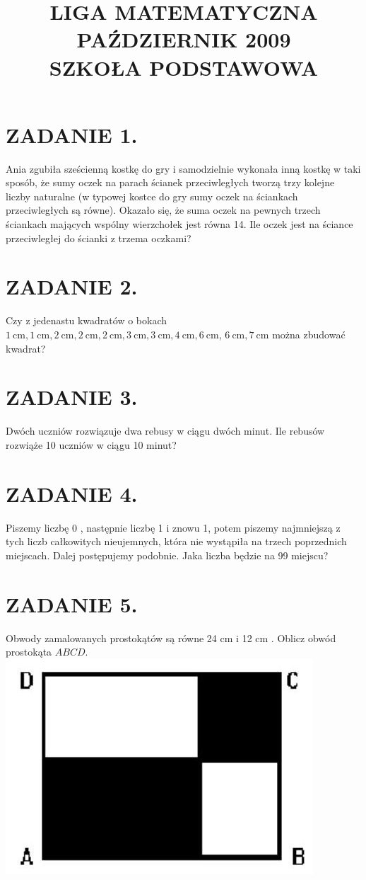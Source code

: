 \documentclass[10pt]{article}
\title{LIGA MATEMATYCZNA \\
 PAŹDZIERNIK 2009 \\
 SZKOŁA PODSTAWOWA }
\author{}
\date{}
\begin{document}
\maketitle
\section*{ZADANIE 1.}
Ania zgubiła sześcienną kostkę do gry i samodzielnie wykonała inną kostkę w taki sposób, że sumy oczek na parach ścianek przeciwległych tworzą trzy kolejne liczby naturalne (w typowej kostce do gry sumy oczek na ściankach przeciwległych są równe). Okazało się, że suma oczek na pewnych trzech ściankach mających wspólny wierzchołek jest równa 14. Ile oczek jest na ściance przeciwległej do ścianki z trzema oczkami?

\section*{ZADANIE 2.}
Czy z jedenastu kwadratów o bokach \(1 \mathrm{~cm}, 1 \mathrm{~cm}, 2 \mathrm{~cm}, 2 \mathrm{~cm}, 2 \mathrm{~cm}, 3 \mathrm{~cm}, 3 \mathrm{~cm}, 4 \mathrm{~cm}, 6 \mathrm{~cm}\), \(6 \mathrm{~cm}, 7 \mathrm{~cm}\) można zbudować kwadrat?

\section*{ZADANIE 3.}
Dwóch uczniów rozwiązuje dwa rebusy w ciągu dwóch minut. Ile rebusów rozwiąże 10 uczniów w ciągu 10 minut?

\section*{ZADANIE 4.}
Piszemy liczbę 0 , następnie liczbę 1 i znowu 1, potem piszemy najmniejszą z tych liczb całkowitych nieujemnych, która nie wystąpiła na trzech poprzednich miejscach. Dalej postępujemy podobnie. Jaka liczba będzie na 99 miejscu?

\section*{ZADANIE 5.}
Obwody zamalowanych prostokątów są równe 24 cm i 12 cm . Oblicz obwód prostokąta \(A B C D\).\\
\includegraphics[max width=\textwidth, center]{2024_11_21_e15659a0efdc0a6e5618g-1}
\end{document}
